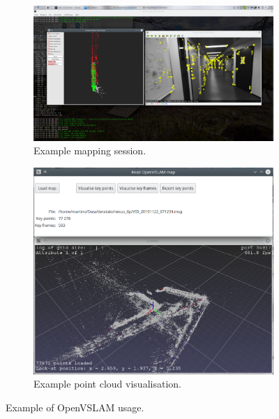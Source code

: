 \documentclass[11pt, letterpaper, twoside]{article}
\begin{document}
\begin{figure}[tb]
    \centering
    \begin{subfigure}[t]{.49\textwidth}
        \includegraphics[width=\linewidth]{openvslam.png}
        \caption{Example mapping session.}\label{fig:openvslam_mapping}
    \end{subfigure}
    \begin{subfigure}[t]{.49\textwidth}
        \includegraphics[width=\linewidth]{load_map.png}
        \caption{Example point cloud visualisation.}\label{fig:openvslam_load_map}
    \end{subfigure}
    \caption{Example of OpenVSLAM usage.}\label{fig:openvslam}
\end{figure}

\begin{figure}[h!]
    \centering
\end{figure}
\end{document}
